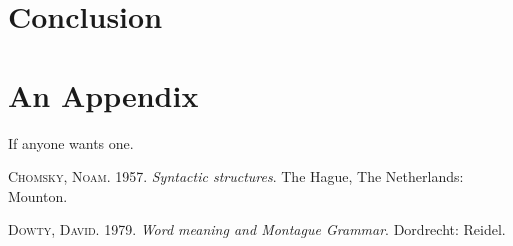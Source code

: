 \documentclass{language}
\begin{document}
\section{Conclusion}

\lipsum



\appendix

\section{An Appendix}

If anyone wants one.

\listoftables

\listoffigures

%

\begin{thebibliography}{2}
\providecommand{\natexlab}[1]{#1}
\providecommand{\url}{\relax}
\providecommand{\urlprefix}{Online: }

\textsc{Chomsky, Noam}. 1957.
\newblock \emph{Syntactic structures}.
\newblock The Hague, The Netherlands: Mounton.

\textsc{Dowty, David}. 1979.
\newblock \emph{Word meaning and {M}ontague {G}rammar}.
\newblock Dordrecht: Reidel.

\end{thebibliography}


\fendnotes
\end{document}
